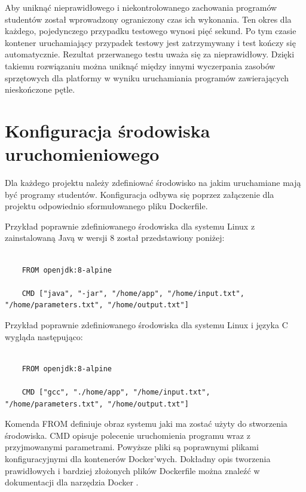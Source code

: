 Aby uniknąć nieprawidłowego i niekontrolowanego zachowania programów studentów został wprowadzony ograniczony czas ich wykonania.
Ten okres dla każdego, pojedynczego przypadku testowego wynosi pięć sekund.
Po tym czasie kontener uruchamiający przypadek testowy jest zatrzymywany i test kończy się automatycznie.
Rezultat przerwanego testu uważa się za nieprawidłowy.
Dzięki takiemu rozwiązaniu można uniknąć między innymi wyczerpania zasobów sprzętowych dla platformy w wyniku uruchamiania programów zawierających nieskończone pętle.

\vfill

\section {Konfiguracja środowiska uruchomieniowego}
\label{environment_configuration}

Dla każdego projektu należy zdefiniować środowisko na jakim uruchamiane mają być programy studentów.
Konfiguracja odbywa się poprzez załączenie dla projektu odpowiednio sformułowanego pliku Dockerfile.

Przykład poprawnie zdefiniowanego środowiska dla systemu Linux z zainstalowaną Javą w wersji 8 został przedstawiony poniżej:

{\selectfont
\tiny
\begin{lstlisting}

    FROM openjdk:8-alpine

    CMD ["java", "-jar", "/home/app", "/home/input.txt", "/home/parameters.txt", "/home/output.txt"]

\end{lstlisting}
}

Przykład poprawnie zdefiniowanego środowiska dla systemu Linux i języka C wygląda następująco:

{\selectfont
\tiny
\begin{lstlisting}

    FROM openjdk:8-alpine

    CMD ["gcc", "./home/app", "/home/input.txt", "/home/parameters.txt", "/home/output.txt"]

\end{lstlisting}
}

Komenda FROM definiuje obraz systemu jaki ma zostać użyty do stworzenia środowiska.
CMD opisuje polecenie uruchomienia programu wraz z przyjmowanymi parametrami.
Powyższe pliki są poprawnymi plikami konfiguracyjnymi dla kontenerów Docker'wych.
Dokładny opis tworzenia prawidłowych i bardziej złożonych plików Dockerfile można znaleźć w dokumentacji dla narzędzia Docker \cite{docker-config}.

